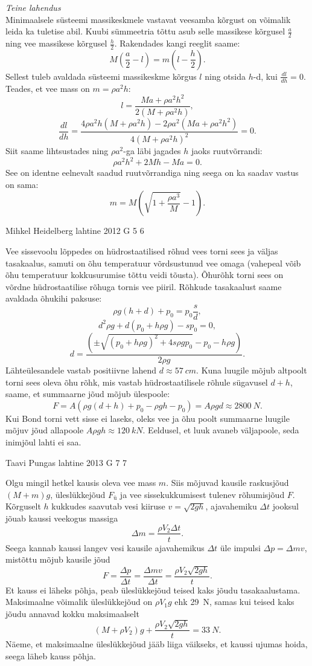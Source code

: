 \documentclass[11pt]{article}
\begin{document}
{{\emph{Teine lahendus}\\
Minimaalsele süsteemi massikeskmele vastavat veesamba kõrgust on võimalik leida ka tuletise abil. Kuubi sümmeetria tõttu asub selle massikese kõrgusel $\frac{a}{2}$ ning vee massikese kõrgusel $\frac{h}{2}$. Rakendades kangi reeglit saame: 
$$M(\frac{a}{2}-l)=m(l-\frac{h}{2}).$$ 
Sellest tuleb avaldada süsteemi massikeskme kõrgus $l$ ning otsida $h$-d, kui $\frac{dl}{dh}=0$. Teades, et vee mass on $m=\rho a^2h$:
$$l=\frac{Ma+\rho a^2h^2}{2(M+\rho a^2h)},$$ 
$$\frac{dl}{dh}=\frac{4\rho a^2h(M+\rho a^2h)-2\rho a^2(Ma+\rho a^2h^2)}{4(M+\rho a^2h)^2}=0.$$ 
Siit saame lihtsustades ning $\rho a^2$-ga läbi jagades $h$ jaoks ruutvõrrandi:
$$\rho a^2h^2+2Mh-Ma=0.$$ 
See on identne eelnevalt saadud ruutvõrrandiga ning seega on ka saadav vastus on sama:
$$m=M(\sqrt{1+\frac{\rho a^3}{M}}-1).$$
\fi
}

{Mihkel Heidelberg} %
{lahtine} %
{2012} %
{G 5} %
{6} %
{

\ifSolution
Vee sissevoolu lõppedes on hüdrostaatilised rõhud vees torni sees ja väljas tasakaalus, samuti on õhu temperatuur võrdsustunud vee omaga (vahepeal võib õhu temperatuur kokkusurumise tõttu veidi tõusta). Õhurõhk torni sees on võrdne hüdrostaatilise rõhuga tornis vee piiril. Rõhkude tasakaalust saame avaldada õhukihi paksuse:
$$ \rho g (h+d) + p_0 = p_0 \frac{s}{d},$$
$$ d^2 \rho g + d (p_0 + h \rho g) - s p_0=0, $$
$$ d = \frac{( \pm \sqrt{(p_0 + h \rho g)^2 + 4 s \rho g p_0 } - p_0 - h \rho g)}{2\rho g }.$$
Lähteülesandele vastab positiivne lahend $d \approx \SI{57}{cm}$.
Kuna luugile mõjub altpoolt torni sees oleva õhu rõhk, mis vastab hüdrostaatilisele rõhule sügavusel $d+h$, saame, et summaarne jõud mõjub ülespoole:
$$F = A(\rho g (d+h) + p_0 - \rho g h - p_0) = A \rho g d \approx \SI{2800}{N}. $$ 
Kui Bond torni vett sisse ei laseks, oleks vee ja õhu poolt summaarne luugile mõjuv jõud allapoole $A \rho g h \approx \SI{120}{kN}$. Eeldusel, et luuk avaneb väljapoole, seda inimjõul lahti ei saa.
\fi
}

{Taavi Pungas} %
{lahtine} %
{2013} %
{G 7} %
{7} %
{

\ifSolution
Olgu mingil hetkel kausis oleva vee mass $m$. Siis mõjuvad kausile raskusjõud $(M+m)g$, üleslükkejõud $F_{ü}$ ja vee sissekukkumisest tulenev rõhumisjõud $F$. Kõrguselt $h$ kukkudes saavutab vesi kiiruse $v=\sqrt{2gh}$, ajavahemiku $\Delta t$ jooksul jõuab kaussi veekogus massiga
\[
\Delta m = \frac{\rho V_2 \Delta t}{t}.
\]
Seega kannab kaussi langev vesi kausile ajavahemikus $\Delta t$ üle impulsi $\Delta p =\Delta m v$, mistõttu mõjub kausile jõud
\[
F=\frac{\Delta p}{\Delta t}=\frac{\Delta m v}{\Delta t}=\frac{\rho V_2 \sqrt{2gh}}{t}.
\]
Et kauss ei läheks põhja, peab üleslükkejõud teised kaks jõudu tasakaalustama. Maksimaalne võimalik üleslükkejõud on $\rho V_1 g$ ehk \SI{29}{N}, samas kui teised kaks jõudu annavad kokku maksimaalselt
\[
(M+\rho V_2)g + \frac{\rho V_2 \sqrt{2gh}}{t} = \SI{33}{N}.
\]
Näeme, et maksimaalne üleslükkejõud jääb liiga väikseks, et kaussi ujumas hoida, seega läheb kauss põhja.
\fi
}

}
\end{document}
